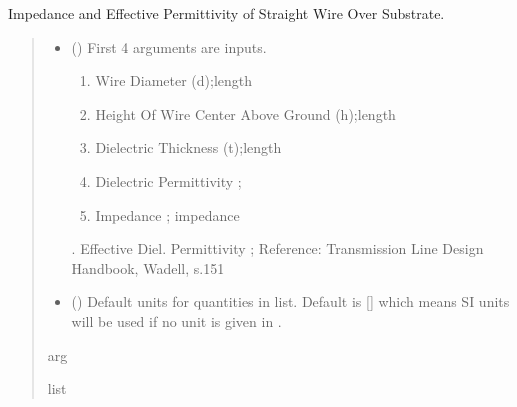 \documentclass[letterpaper,10pt,english]{sphinxmanual}
\begin{document}
\begin{fulllineitems}
\label{\detokenize{components:components.Zo_eeff_StraightWireOverSubstrate}}
\pysigstartsignatures
{}
\pysigstopsignatures
\sphinxAtStartPar
Impedance and Effective Permittivity of Straight Wire Over Substrate.
\begin{quote}\begin{description}
\begin{itemize}
\item {}
\sphinxAtStartPar
{} () \textendash{}
\sphinxAtStartPar
First 4 arguments are inputs.
\begin{enumerate}
%
\item {}
\sphinxAtStartPar
Wire Diameter (d);length

\item {}
\sphinxAtStartPar
Height Of Wire Center Above Ground (h);length

\item {}
\sphinxAtStartPar
Dielectric Thickness (t);length

\item {}
\sphinxAtStartPar
Dielectric Permittivity ;

\item {}
\sphinxAtStartPar
Impedance ; impedance

\end{enumerate}

.  Effective Diel. Permittivity ;
Reference:  Transmission Line Design Handbook, Wadell, s.151


\item {}
\sphinxAtStartPar
{} (\sphinxstyleliteralemphasis{\sphinxupquote{, }}) \textendash{} Default units for quantities in  list. Default is {[}{]} which means SI units will be used if no unit is given in .

\end{itemize}

\sphinxAtStartPar
arg

\sphinxAtStartPar
list

\end{description}\end{quote}

\end{fulllineitems}
\end{document}
